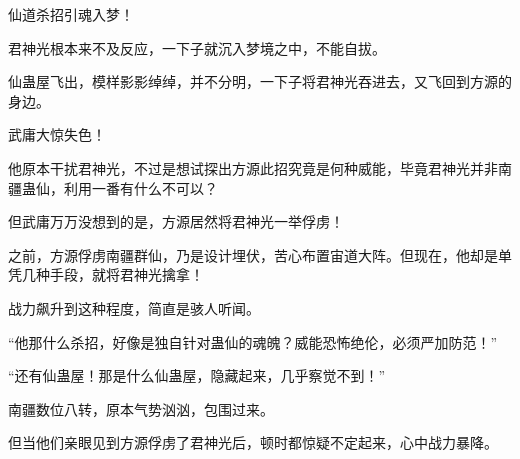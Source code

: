 \begin{this_body}
仙道杀招引魂入梦！

君神光根本来不及反应，一下子就沉入梦境之中，不能自拔。

仙蛊屋飞出，模样影影绰绰，并不分明，一下子将君神光吞进去，又飞回到方源的身边。

武庸大惊失色！

他原本干扰君神光，不过是想试探出方源此招究竟是何种威能，毕竟君神光并非南疆蛊仙，利用一番有什么不可以？

但武庸万万没想到的是，方源居然将君神光一举俘虏！

之前，方源俘虏南疆群仙，乃是设计埋伏，苦心布置宙道大阵。但现在，他却是单凭几种手段，就将君神光擒拿！

战力飙升到这种程度，简直是骇人听闻。

“他那什么杀招，好像是独自针对蛊仙的魂魄？威能恐怖绝伦，必须严加防范！”

“还有仙蛊屋！那是什么仙蛊屋，隐藏起来，几乎察觉不到！”

南疆数位八转，原本气势汹汹，包围过来。

但当他们亲眼见到方源俘虏了君神光后，顿时都惊疑不定起来，心中战力暴降。

\end{this_body}


